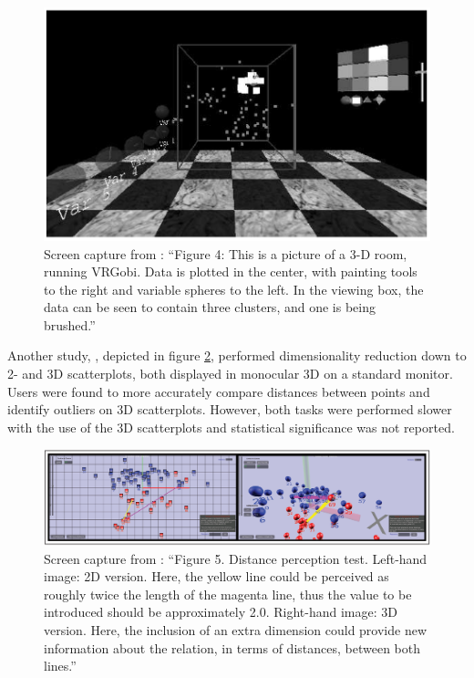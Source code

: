\documentclass{monashthesis}
\begin{document}
\begin{figure}

{\centering \includegraphics[width=0.7\linewidth]{./figures/nelson98fig} 

}

\caption{Screen capture from \textcite{nelson_xgobi_1998}:
``Figure 4: This is a picture of a 3-D room, running VRGobi. Data is
plotted in the center, with painting tools to the right and variable
spheres to the left. In the viewing box, the data can be seen to contain
three clusters, and one is being brushed.''}\label{fig:nelson98fig}
\end{figure}

Another study, \textcite{gracia_new_2016}, depicted in figure
\ref{fig:gracia16fig}, performed dimensionality reduction down to 2- and
3D scatterplots, both displayed in monocular 3D on a standard monitor.
Users were found to more accurately compare distances between points and
identify outliers on 3D scatterplots. However, both tasks were performed
slower with the use of the 3D scatterplots and statistical significance
was not reported.









\begin{figure}

{\centering \includegraphics[width=0.7\linewidth]{./figures/gracia16fig} 

}

\caption{Screen capture from \textcite{gracia_new_2016}:
``Figure 5. Distance perception test. Left-hand image: 2D version. Here,
the yellow line could be perceived as roughly twice the length of the
magenta line, thus the value to be introduced should be approximately
2.0. Right-hand image: 3D version. Here, the inclusion of an extra
dimension could provide new information about the relation, in terms of
distances, between both lines.''}\label{fig:gracia16fig}
\end{figure}
\end{document}
